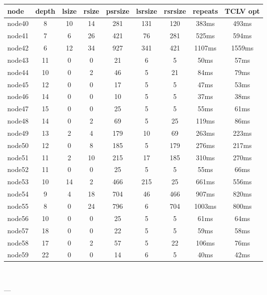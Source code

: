 \begin{tabular}{|l|c|c|c|c|c|c|c|c|}
\hline node & depth & lsize & rsize & psrsize & lsrsize & rsrsize   & repeats & TCLV opt\\
    \hline node40 & 8 & 10 & 14 & 281 & 131 & 120 & 383ms & 493ms\\
    \hline node41 & 7 & 6 & 26 & 421 & 76 & 281 & 525ms & 594ms\\
    \hline node42 & 6 & 12 & 34 & 927 & 341 & 421 & 1107ms & 1559ms\\
    \hline node43 & 11 & 0 & 0 & 21 & 6 & 5 & 50ms & 57ms\\
    \hline node44 & 10 & 0 & 2 & 46 & 5 & 21 & 84ms & 79ms\\
    \hline node45 & 12 & 0 & 0 & 17 & 5 & 5 & 47ms & 53ms\\
    \hline node46 & 14 & 0 & 0 & 10 & 5 & 5 & 37ms & 38ms\\
    \hline node47 & 15 & 0 & 0 & 25 & 5 & 5 & 55ms & 61ms\\
    \hline node48 & 14 & 0 & 2 & 69 & 5 & 25 & 119ms & 86ms\\
    \hline node49 & 13 & 2 & 4 & 179 & 10 & 69 & 263ms & 223ms\\
    \hline node50 & 12 & 0 & 8 & 185 & 5 & 179 & 276ms & 217ms\\
    \hline node51 & 11 & 2 & 10 & 215 & 17 & 185 & 310ms & 270ms\\
    \hline node52 & 11 & 0 & 0 & 25 & 5 & 5 & 55ms & 66ms\\
    \hline node53 & 10 & 14 & 2 & 466 & 215 & 25 & 661ms & 556ms\\
    \hline node54 & 9 & 4 & 18 & 704 & 46 & 466 & 907ms & 820ms\\
    \hline node55 & 8 & 0 & 24 & 796 & 6 & 704 & 1003ms & 800ms\\
    \hline node56 & 10 & 0 & 0 & 25 & 5 & 5 & 61ms & 64ms\\
    \hline node57 & 18 & 0 & 0 & 22 & 5 & 5 & 59ms & 58ms\\
    \hline node58 & 17 & 0 & 2 & 57 & 5 & 22 & 106ms & 76ms\\
    \hline node59 & 22 & 0 & 0 & 14 & 6 & 5 & 40ms & 42ms\\

\hline
\end{tabular} \

---



